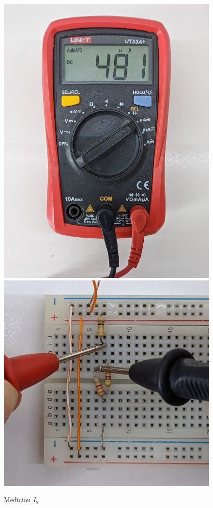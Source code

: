 \documentclass[a4paper,12pt, spanish]{report}
\begin{document}
\begin{figure}[H]
\begin{minipage}{0.3\textwidth}
            \caption{Medicion $I_2$.}
          \end{minipage}
          \begin{minipage}{0.3\textwidth}
            \centering
            \includegraphics[width=1\linewidth]{pictures/mult-i3.jpg}
            \includegraphics[width=1\linewidth]{pictures/prot-i3.jpg}

\end{minipage}
\end{figure}
\end{document}
